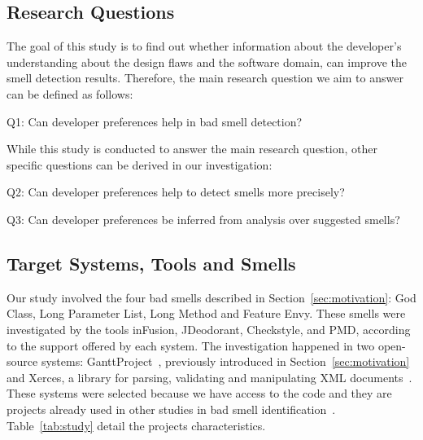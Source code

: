 \documentclass[conference]{IEEEtran}
\begin{document}
\subsection{Research Questions}
\label{sec:questions}

The goal of this study is to find out whether information about the developer's understanding about the design flaws and the software domain, can improve the smell detection results. Therefore, the main research question we aim to answer can be defined as follows:

\begin{flushleft}
Q1: Can developer preferences help in bad smell detection?
\end{flushleft}

While this study is conducted to answer the main research question, other specific questions can be derived in our investigation:

\begin{flushleft}

Q2: Can developer preferences help to detect smells more precisely?

Q3: Can developer preferences be inferred from analysis over suggested smells?


\end{flushleft}

\subsection{Target Systems, Tools and Smells}
\label{sec:systems}

Our study involved the four bad smells described in Section~\ref{sec:motivation}: God Class, Long Parameter List, Long Method and Feature Envy. These smells were investigated by the tools inFusion, JDeodorant, Checkstyle, and PMD, according to the support offered by each system. The investigation happened in two open-source systems: GanttProject~\cite{GanttProject}, previously introduced in Section~\ref{sec:motivation} and Xerces, a library for parsing, validating and manipulating XML documents~\cite{Xerces}. These systems were selected because we have access to the code and they are projects already used in other studies in bad smell identification~\cite{Moha2010c, Ouni2012f, Palomba2013d}. Table~\ref{tab:study} detail the projects characteristics.
\end{document}

